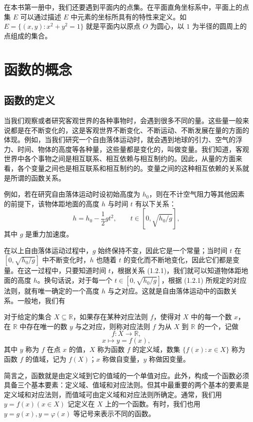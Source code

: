 \documentclass[UTF8,12pt,a4paper,fontset=fandol]{ctexbook}
\begin{document}
在本书第一册中，我们还要遇到平面内的点集。在平面直角坐标系中，平面上的点集 $E$ 可以通过描述 $E$ 中元素的坐标所具有的特性来定义。如 $E=\{(x,y):x^2+y^2=1\}$ 就是平面内以原点 $O$ 为圆心，以 $1$ 为半径的圆周上的点组成的集合。

\section{函数的概念}

\subsection{函数的定义}

当我们观察或者研究客观世界的各种事物时，会遇到很多不同的量。这些量一般来说都是在不断变化的，这是客观世界不断变化、不断运动、不断发展在量的方面的体现。例如，当我们研究一个自由落体运动时，就会遇到地球的引力、空气的浮力、时间、物体的高度等各种量，这些量都是变化的，叫做变量。我们知道，客观世界中各个事物之间是相互联系、相互依赖与相互制约的。因此，从量的方面来看，各个变量之间也是相互联系和相互制约的。变量之间的这种相互依赖的关系就是所谓的函数关系。

例如，若在研究自由落体运动时设初始高度为 $h_0$，则在不计空气阻力等其他因素的前提下，该物体距地面的高度 $h$ 与时间 $t$ 有以下关系：
\begin{equation}
  h=h_0-\frac12gt^2,\qquad t\in[0,\sqrt{h_0/g}],
  \tag{1.2.1}
\end{equation}
其中 $g$ 是重力加速度。

在以上自由落体运动过程中，$g$ 始终保持不变，因此它是一个常量；当时间 $t$ 在 $[0,\sqrt{h_0/g}]$ 中不断变化时，$h$ 也随着 $t$ 的变化而不断地变化，因此它们都是变量。在这一过程中，只要知道时间 $t$，根据关系 (1.2.1)，我们就可以知道物体距地面的高度 $h$。换句话说，对于每一个 $t\in[0,\sqrt{h_0/g}]$，根据 (1.2.1) 所规定的对应法则，就有唯一确定的一个高度 $h$ 与之对应。这就是自由落体运动中的函数关系。一般地，我们有

\noindent{}\quad 对于给定的集合 $X\subseteq\mathbb{R}$，如果存在某种对应法则 $f$，使得对 $X$ 中的每一个数 $x$，在 $\mathbb{R}$ 中存在唯一的数 $y$ 与之对应，则称对应法则 $f$ 为从 $X$ 到 $\mathbb{R}$ 的一个，记做
\[
  f:X\to\mathbb{R},
\]
\[
  x\mapsto y=f(x),
\]
其中 $y$ 称为 $f$ 在点 $x$ 的值，$X$ 称为函数 $f$ 的定义域，数集 $\{f(x):x\in X\}$ 称为函数 $f$ 的值域，记为 $f(X)$；$x$ 称做自变量，$y$ 称做因变量。

简言之，函数就是由定义域到它的值域的一个单值对应。此外，构成一个函数必须具备三个基本要素：定义域、值域和对应法则。但其中最重要的两个基本的要素是定义域和对应法则，而值域可由定义域和对应法则所确定。通常，我们用 $y=f(x)(x\in X)$ 记定义在 $X$ 上的一个函数。有时，我们也用 $y=g(x),y=\varphi(x)$ 等记号来表示不同的函数。
\end{document}

